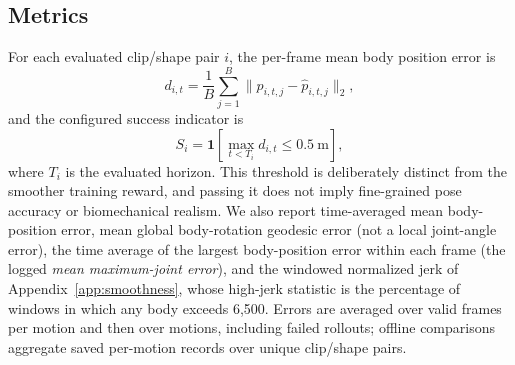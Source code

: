 \subsection{Metrics}\label{sec:metrics}

For each evaluated clip/shape pair $i$, the per-frame mean body position error is
\begin{equation}
    d_{i,t} = \frac{1}{B}\sum_{j=1}^{B}
                 \|p_{i,t,j}-\hat{p}_{i,t,j}\|_2 ,
\end{equation}
and the configured success indicator is
\begin{equation}
    S_i = \mathbf{1}\!\left[
             \max_{t<T_i}d_{i,t}\leq 0.5\ \mathrm{m}
          \right],
    \label{eq:success}
\end{equation}
where $T_i$ is the evaluated horizon. This threshold is deliberately distinct
from the smoother training reward, and passing it does not imply fine-grained
pose accuracy or biomechanical realism. We also report time-averaged mean
body-position error, mean global body-rotation geodesic error (not a local
joint-angle error), the time average of the largest body-position error within
each frame (the logged \emph{mean maximum-joint error}), and the windowed
normalized jerk of Appendix~\ref{app:smoothness}, whose high-jerk statistic is
the percentage of windows in which any body exceeds 6,500. Errors are averaged
over valid frames per motion and then over motions, including failed rollouts;
offline comparisons aggregate saved per-motion records over unique clip/shape
pairs.
